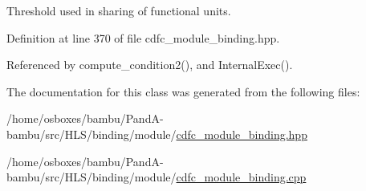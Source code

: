 Threshold used in sharing of functional units. 



Definition at line 370 of file cdfc\+\_\+module\+\_\+binding.\+hpp.



Referenced by compute\+\_\+condition2(), and Internal\+Exec().



The documentation for this class was generated from the following files\+:\begin{DoxyCompactItemize}
\item 
/home/osboxes/bambu/\+Pand\+A-\/bambu/src/\+H\+L\+S/binding/module/\hyperlink{cdfc__module__binding_8hpp}{cdfc\+\_\+module\+\_\+binding.\+hpp}\item 
/home/osboxes/bambu/\+Pand\+A-\/bambu/src/\+H\+L\+S/binding/module/\hyperlink{cdfc__module__binding_8cpp}{cdfc\+\_\+module\+\_\+binding.\+cpp}\end{DoxyCompactItemize}
